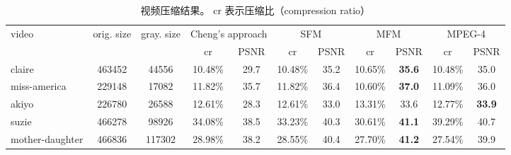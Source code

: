\begin{table}[t]
  \centering \scriptsize
  \caption{视频压缩结果。 cr 表示压缩比（compression ratio）}
  \label{tab:more-example}
  \begin{tabular}{|l|c|c|c|c|c|c|c|c|c|c|}
    \hline
    video & orig. size & gray. size & \multicolumn{2}{|c|}{Cheng's approach} & \multicolumn{2}{|c|}{SFM} & \multicolumn{2}{|c|}{MFM} & \multicolumn{2}{|c|}{MPEG-4} \\
    \cline{4-11}
    & & & cr & PSNR & cr & PSNR & cr & PSNR & cr & PSNR \\
    \hline
    claire & 463452 & 44556 & 10.48\% & 29.7 & 10.48\% & 35.2 & 10.65\% & \textbf{35.6} & 10.48\% & 35.0 \\
    \hline
    miss-america & 229148 & 17082 & 11.82\% & 35.7 & 11.82\% & 36.4 & 10.60\% & \textbf{37.0} & 11.09\% & 36.0 \\
    \hline
    akiyo & 226780 & 26588 & 12.61\% & 28.3 & 12.61\% & 33.0 & 13.31\% & 33.6 & 12.77\% & \textbf{33.9} \\
    \hline
    suzie & 466278 & 98926 & 34.08\% & 38.5 & 33.23\% & 40.3 & 30.61\% & \textbf{41.1} & 39.29\% & 40.7 \\
    \hline
    mother-daughter & 466836 & 117302 & 28.98\% & 38.2 & 28.55\% & 40.4 & 27.70\% & \textbf{41.2} & 27.54\% & 39.9 \\
    \hline
  \end{tabular}
\end{table}

